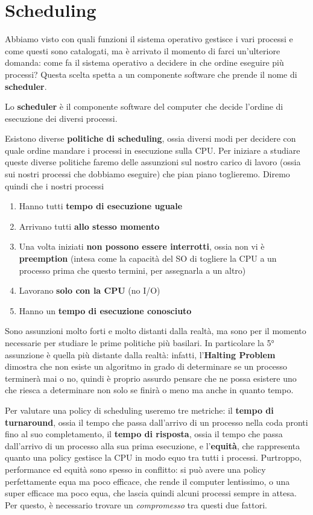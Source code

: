 \documentclass[11pt, a4paper, titlepage, oneside]{scrbook}
\begin{document}
\section{Scheduling}

Abbiamo visto con quali funzioni il sistema operativo gestisce i vari processi e come questi sono catalogati, ma è arrivato il momento di farci un'ulteriore domanda: come fa il sistema operativo a decidere in che ordine eseguire più processi? Questa scelta spetta a un componente software che prende il nome di \textbf{scheduler}. 

\begin{Definizione}[Scheduler]
\label{def-scheduler}
Lo \textbf{scheduler} è il componente software del computer che decide l'ordine di esecuzione dei diversi processi.
\end{Definizione}

Esistono diverse \textbf{politiche di scheduling}, ossia diversi modi per decidere con quale ordine mandare i processi in esecuzione sulla CPU. Per iniziare a studiare queste diverse politiche faremo delle assunzioni sul nostro carico di lavoro (ossia sui nostri processi che dobbiamo eseguire) che pian piano toglieremo. Diremo quindi che i nostri processi
\begin{enumerate}[label=\arabic*°]
    \item Hanno tutti \textbf{tempo di esecuzione uguale}
    \item Arrivano tutti \textbf{allo stesso momento}
    \item Una volta iniziati \textbf{non possono essere interrotti}, ossia non vi è \textbf{preemption} (intesa come la capacità del SO di togliere la CPU a un processo prima che questo termini, per assegnarla a un altro)
    \item Lavorano \textbf{solo con la CPU} (no I/O)
    \item Hanno un \textbf{tempo di esecuzione conosciuto}
\end{enumerate}
Sono assunzioni molto forti e molto distanti dalla realtà, ma sono per il momento necessarie per studiare le prime politiche più basilari. In particolare la 5° assunzione è quella più distante dalla realtà: infatti, l'\textbf{Halting Problem} dimostra che non esiste un algoritmo in grado di determinare se un processo terminerà mai o no, quindi è proprio assurdo pensare che ne possa esistere uno che riesca a determinare non solo se finirà o meno ma anche in quanto tempo. 

Per valutare una policy di scheduling useremo tre metriche: il \textbf{tempo di turnaround}, ossia il tempo che passa dall'arrivo di un processo nella coda pronti fino al suo completamento, il \textbf{tempo di risposta}, ossia il tempo che passa dall'arrivo di un processo alla sua prima esecuzione, e l'\textbf{equità}, che rappresenta quanto una policy gestisce la CPU in modo equo tra tutti i processi. Purtroppo, performance ed equità sono spesso in conflitto: si può avere una policy perfettamente equa ma poco efficace, che rende il computer lentissimo, o una super efficace ma poco equa, che lascia quindi alcuni processi sempre in attesa. Per questo, è necessario trovare un \textit{compromesso} tra questi due fattori.
\end{document}
